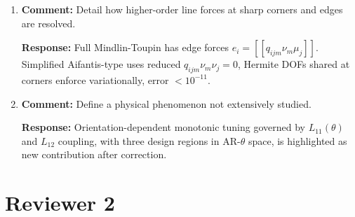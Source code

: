 \documentclass[12pt,a4paper]{article}
\begin{document}
\begin{enumerate}[leftmargin=14pt, itemsep=10pt]
\textbf{Response:} Without micro-inertia $\omega^2=c^2k^2(1+l_s^2k^2/10)$. Including $T_g$ gives $\omega^2=c^2k^2(1+l_s^2k^2/10)/(1+l_k^2k^2)$. For $lk<0.3$ for first modes, effect $<5\%$, omitted for low-frequency focus.

\item \textbf{Comment:} Detail how higher-order line forces at sharp corners and edges are resolved.

\textbf{Response:} Full Mindlin-Toupin has edge forces $e_i=[\![q_{ijm}\nu_m\mu_j]\!]$. Simplified Aifantis-type uses reduced $q_{ijm}\nu_m\nu_j=0$, Hermite DOFs shared at corners enforce variationally, error $<10^{-11}$.

\item \textbf{Comment:} Define a physical phenomenon not extensively studied.

\textbf{Response:} Orientation-dependent monotonic tuning governed by $L_{11}(\theta)$ and $L_{12}$ coupling, with three design regions in AR-$\theta$ space, is highlighted as new contribution after correction.

\end{enumerate}

\section*{Reviewer 2}
\end{document}
